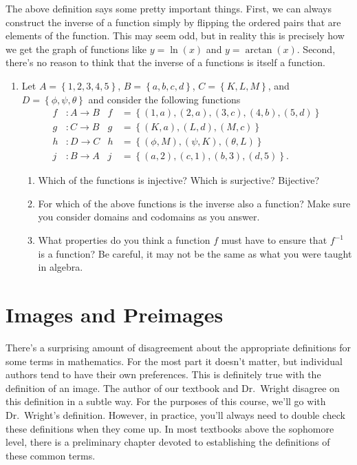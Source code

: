 \documentclass[12 pt]{article}
\newcommand{\set}[1]{\left\{#1\right\}}
\theoremstyle{definition}
\theoremstyle{plain}
\theoremstyle{mytheorem}
\theoremstyle{myexample}
\theoremstyle{mydefinition}
\begin{document}
The above definition says some pretty important things.  First, we can always construct the inverse of a function simply by flipping the ordered pairs that are elements of the function.  This may seem odd, but in reality this is precisely how we get the graph of functions like $y = \ln(x)$ and $y=\arctan(x)$.  Second, there's no reason to think that the inverse of a functions is itself a function.  

\begin{enumerate}[resume]
\item Let $A=\set{1,2,3,4,5}$, $B=\set{a,b,c,d}$, $C=\set{K,L,M}$, and $D = \set{\phi,\psi,\theta}$ and consider the following functions
	\begin{align*}
	f &: A \to B & f&= \set{(1,a),(2,a),(3,c),(4,b),(5,d)}\\
	g &: C \to B & g&= \set{(K,a),(L,d),(M,c)}\\
	h &: D \to C & h&= \set{(\phi,M),(\psi,K),(\theta,L)}\\
	j &: B \to A & j&= \set{(a,2),(c,1),(b,3),(d,5)}.
	\end{align*}
	\begin{enumerate}
	\item Which of the functions is injective?  Which is surjective?  Bijective?
	
	\vspace{3in}
	
	\item For which of the above functions is the inverse also a function?  Make sure you consider domains and codomains as you answer.
	
	\vspace{1in}
	
	\item What properties do you think a function $f$ must have to ensure that $f^{-1}$ is a function?  Be careful, it may not be the same as what you were taught in algebra.
	
	\vspace{1.5in}
	\end{enumerate}
\end{enumerate}

\section{Images and Preimages}

There's a surprising amount of disagreement about the appropriate definitions for some terms in mathematics.  For the most part it doesn't matter, but individual authors tend to have their own preferences.  This is definitely true with the definition of an image.  The author of our textbook and Dr.~Wright disagree on this definition in a subtle way.  For the purposes of this course, we'll go with Dr.~Wright's definition.  However, in practice, you'll always need to double check these definitions when they come up.  In most textbooks above the sophomore level, there is a preliminary chapter devoted to establishing the definitions of these common terms. 
\end{document}
